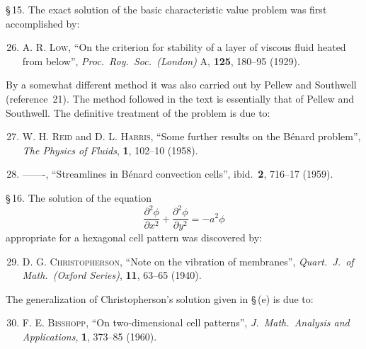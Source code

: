 \noindent \S\,15. The exact solution of the basic characteristic value problem was first
accomplished by:

\begin{enumerate}
\setcounter{enumi}{25}

\item \textsc{A. R. Low}, ``On the criterion for stability of a layer of viscous fluid heated
  from below'', \textit{Proc.\ Roy.\ Soc.\ (London)} A, \textbf{125}, 180--95 (1929).

\end{enumerate}

\noindent By a somewhat different method it was also carried out by Pellew and Southwell
(reference~21). The method followed in the text is essentially that of Pellew
and Southwell. The definitive treatment of the problem is due to:

\begin{enumerate}
\setcounter{enumi}{26}

\item \textsc{W. H. Reid} and \textsc{D. L. Harris}, ``Some further results on the B\'enard
  problem'', \textit{The Physics of Fluids}, \textbf{1}, 102--10 (1958).

\item -------, ``Streamlines in B\'enard convection cells'', ibid.\ \textbf{2}, 716--17
  (1959).

\end{enumerate}

\noindent \S\,16. The solution of the equation
%
\[ \frac{\partial^2\phi}{\partial x^2} + \frac{\partial^2\phi}{\partial y^2} = -a^2\phi \]
%
appropriate for a hexagonal cell pattern was discovered by:

\begin{enumerate}
\setcounter{enumi}{28}

\item \textsc{D. G. Christopherson}, ``Note on the vibration of membranes'',
  \textit{Quart.\ J.\ of Math.\ (Oxford Series)}, \textbf{11}, 63--65 (1940).

\end{enumerate}

\noindent The generalization of Christopherson's solution given in \S\,(e) is due to:

\begin{enumerate}
\setcounter{enumi}{29}

\item \textsc{F. E. Bisshopp}, ``On two-dimensional cell patterns'',
  \textit{J.\ Math.\ Analysis and Applications}, \textbf{1}, 373--85 (1960).

\end{enumerate}


